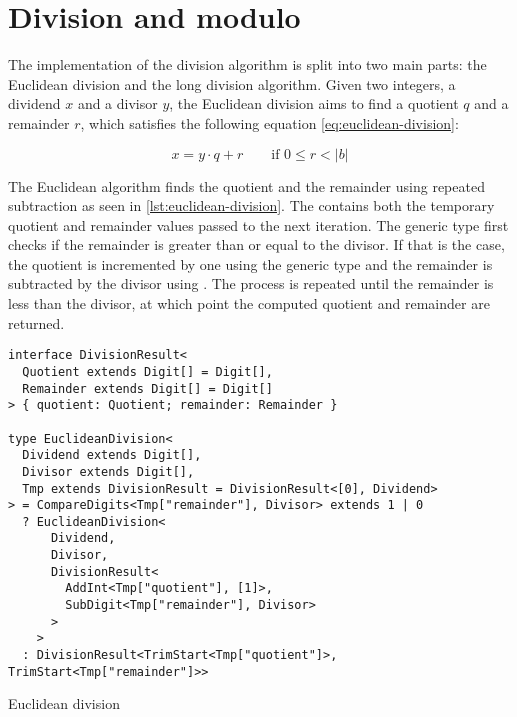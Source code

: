 \section{Division and modulo}

The implementation of the division algorithm is split into two main parts: the Euclidean division and the long division algorithm. Given two integers, a dividend $x$ and a divisor $y$, the Euclidean division aims to find a quotient $q$ and a remainder $r$, which satisfies the following equation \ref{eq:euclidean-division}:

\begin{equation}\label{eq:euclidean-division}
  x = y\cdot q + r \qquad \text{if } 0 \le r < |b|
\end{equation}

The Euclidean algorithm finds the quotient and the remainder using repeated subtraction as seen in \ref{lst:euclidean-division}. The  contains both the temporary quotient and remainder values passed to the next iteration. The  generic type first checks if the remainder is greater than or equal to the divisor. If that is the case, the quotient is incremented by one using the  generic type and the remainder is subtracted by the divisor using . The process is repeated until the remainder is less than the divisor, at which point the computed quotient and remainder are returned.

\begin{listing}[ht]
  \begin{verbatim}
interface DivisionResult<
  Quotient extends Digit[] = Digit[],
  Remainder extends Digit[] = Digit[]
> { quotient: Quotient; remainder: Remainder }

type EuclideanDivision<
  Dividend extends Digit[],
  Divisor extends Digit[],
  Tmp extends DivisionResult = DivisionResult<[0], Dividend>
> = CompareDigits<Tmp["remainder"], Divisor> extends 1 | 0
  ? EuclideanDivision<
      Dividend,
      Divisor,
      DivisionResult<
        AddInt<Tmp["quotient"], [1]>,
        SubDigit<Tmp["remainder"], Divisor>
      >
    >
  : DivisionResult<TrimStart<Tmp["quotient"]>, TrimStart<Tmp["remainder"]>>
\end{verbatim}
  \caption{Euclidean division}\label{lst:euclidean-division}
\end{listing}

